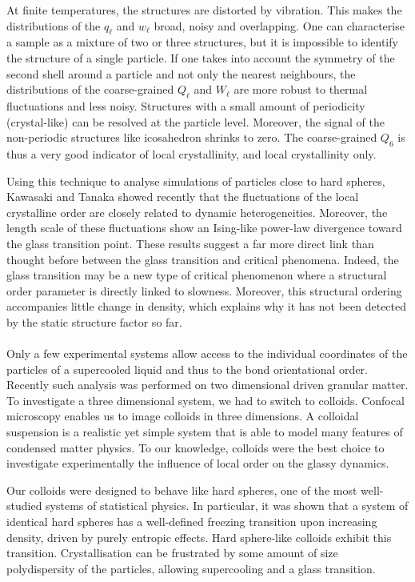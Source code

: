 At finite temperatures, the structures are distorted by vibration. This makes the distributions of the $q_\ell$ and $w_\ell$ broad, noisy and overlapping. One can characterise a sample as a mixture of two or three structures, but it is impossible to identify the structure of a single particle. If one takes into account the symmetry of the second shell around a particle and not only the nearest neighbours, the distributions of the coarse-grained $Q_\ell$ and $W_\ell$ are more robust to thermal fluctuations and less noisy. Structures with a small amount of periodicity (crystal-like) can be resolved at the particle level. Moreover, the signal of the non-periodic structures like icosahedron shrinks to zero. The coarse-grained $Q_6$ is thus a very good indicator of local crystallinity, and local crystallinity only.

Using this technique to analyse simulations of particles close to hard spheres, Kawasaki and Tanaka showed recently that the fluctuations of the local crystalline order are closely related to dynamic heterogeneities. Moreover, the length scale of these fluctuations show an Ising-like power-law divergence toward the glass transition point. These results suggest a far more direct link than thought before between the glass transition and critical phenomena. Indeed, the glass transition may be a new type of critical phenomenon where a structural order parameter is directly linked to slowness. Moreover, this structural ordering accompanies little change in density, which explains why it has not been detected by the static structure factor so far.

\paragraph{}

Only a few experimental systems allow access to the individual coordinates of the particles of a supercooled liquid and thus to the bond orientational order. Recently such analysis was performed on two dimensional driven granular matter. To investigate a three dimensional system, we had to switch to colloids. Confocal microscopy enables us to image colloids in three dimensions. A colloidal suspension is a realistic yet simple system that is able to model many features of condensed matter physics. To our knowledge, colloids were the best choice to investigate experimentally the influence of local order on the glassy dynamics.

Our colloids were designed to behave like hard spheres, one of the most well-studied systems of statistical physics. In particular, it was shown that a system of identical hard spheres has a well-defined freezing transition upon increasing density, driven by purely entropic effects. Hard sphere-like colloids exhibit this transition. Crystallisation can be frustrated by some amount of size polydispersity of the particles, allowing supercooling and a glass transition.

